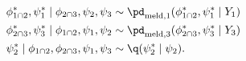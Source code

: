 \begin{align}
  \phi_{1 \cap 2}^{*}, \psi_{1}^{*} \mid \phi_{2 \cap 3}, \psi_{2}, \psi_{3} &\sim \pd_{\text{meld}, 1}(\phi_{1 \cap 2}^{*}, \psi_{1}^{*} \mid Y_{1}) \\ 
  \phi_{2 \cap 3}^{*}, \psi_{3}^{*} \mid \phi_{1 \cap 2}, \psi_{1}, \psi_{2} &\sim \pd_{\text{meld}, 3}(\phi_{2 \cap 3}^{*}, \psi_{3}^{*} \mid Y_{3}) \\
  \psi_{2}^{*} \mid \phi_{1 \cap 2}, \phi_{2 \cap 3}, \psi_{1}, \psi_{3} &\sim \q(\psi_{2}^{*} \mid \psi_{2}).
  \label{eqn:stage-two-proposals}
\end{align}